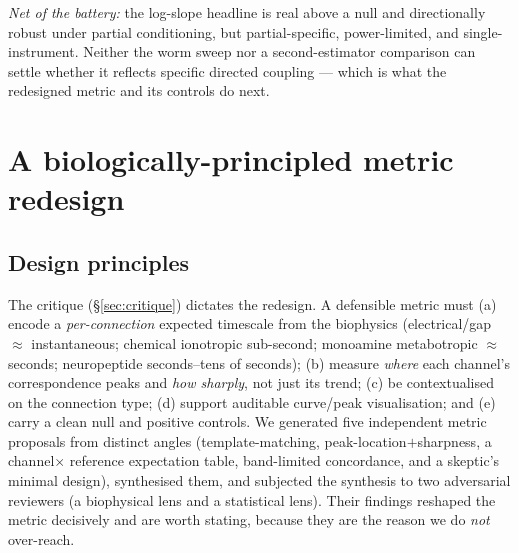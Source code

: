 \documentclass[11pt]{article}
\begin{document}
\medskip\noindent
\emph{Net of the battery:} the log-slope headline is real above a null and directionally robust under
partial conditioning, but partial-specific, power-limited, and single-instrument. Neither the worm
sweep nor a second-estimator comparison can settle whether it reflects specific directed coupling ---
which is what the redesigned metric and its controls do next.

\section{A biologically-principled metric redesign}
\label{sec:redesign}

\subsection{Design principles}
The critique (\S\ref{sec:critique}) dictates the redesign. A defensible metric must (a) encode a
\emph{per-connection} expected timescale from the biophysics (electrical/gap $\approx$ instantaneous;
chemical ionotropic sub-second; monoamine metabotropic $\approx$ seconds; neuropeptide seconds--tens
of seconds); (b) measure \emph{where} each channel's correspondence peaks and \emph{how sharply}, not
just its trend; (c) be contextualised on the connection type; (d) support auditable curve/peak
visualisation; and (e) carry a clean null and positive controls. We generated five independent metric
proposals from distinct angles (template-matching, peak-location$+$sharpness, a channel$\times$
reference expectation table, band-limited concordance, and a skeptic's minimal design), synthesised
them, and subjected the synthesis to two adversarial reviewers (a biophysical lens and a statistical
lens). Their findings reshaped the metric decisively and are worth stating, because they are the
reason we do \emph{not} over-reach.
\end{document}
